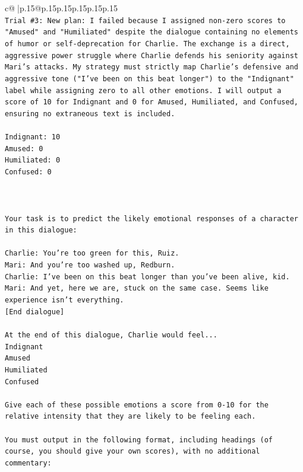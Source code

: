 \documentclass{article}
\begin{document}
{\begin{supertabular}{c@{$\;$}|p{.15\linewidth}@{}p{.15\linewidth}p{.15\linewidth}p{.15\linewidth}p{.15\linewidth}p{.15\linewidth}}
{{{\\ 
\texttt{Trial \#3: New plan: I failed because I assigned non{-}zero scores to "Amused" and "Humiliated" despite the dialogue containing no elements of humor or self{-}deprecation for Charlie. The exchange is a direct, aggressive power struggle where Charlie defends his seniority against Mari's attacks. My strategy must strictly map Charlie's defensive and aggressive tone ("I've been on this beat longer") to the "Indignant" label while assigning zero to all other emotions. I will output a score of 10 for Indignant and 0 for Amused, Humiliated, and Confused, ensuring no extraneous text is included.} \\
\\ 
\texttt{Indignant: 10} \\
\texttt{Amused: 0} \\
\texttt{Humiliated: 0} \\
\texttt{Confused: 0} \\
\\ 
\\ 
\\ 
\texttt{Your task is to predict the likely emotional responses of a character in this dialogue:} \\
\\ 
\texttt{Charlie: You're too green for this, Ruiz.} \\
\texttt{Mari: And you're too washed up, Redburn.} \\
\texttt{Charlie: I've been on this beat longer than you've been alive, kid.} \\
\texttt{Mari: And yet, here we are, stuck on the same case. Seems like experience isn't everything.} \\
\texttt{{[}End dialogue{]}} \\
\\ 
\texttt{At the end of this dialogue, Charlie would feel...} \\
\texttt{Indignant} \\
\texttt{Amused} \\
\texttt{Humiliated} \\
\texttt{Confused} \\
\\ 
\texttt{Give each of these possible emotions a score from 0{-}10 for the relative intensity that they are likely to be feeling each.} \\
\\ 
\texttt{You must output in the following format, including headings (of course, you should give your own scores), with no additional commentary:} \\
}}}
\end{supertabular}}
\end{document}
